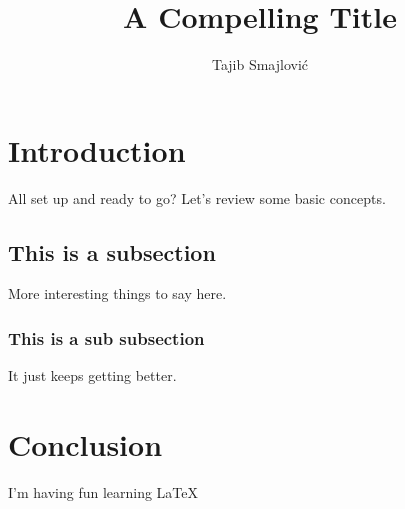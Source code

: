 \documentclass{article}
\title{A Compelling Title}
\author{Tajib Smajlović}
\begin{document}
	
	\maketitle
	
	\section{Introduction}
	
	All set up and ready to go? Let's review some basic concepts.
	
	\subsection{This is a subsection}
	
	More interesting things to say here.
	
	\subsubsection{This is a sub subsection}
	
	It just keeps getting better.
	
	\section{Conclusion}
	
	I'm having fun learning \LaTeX
	
\end{document}
